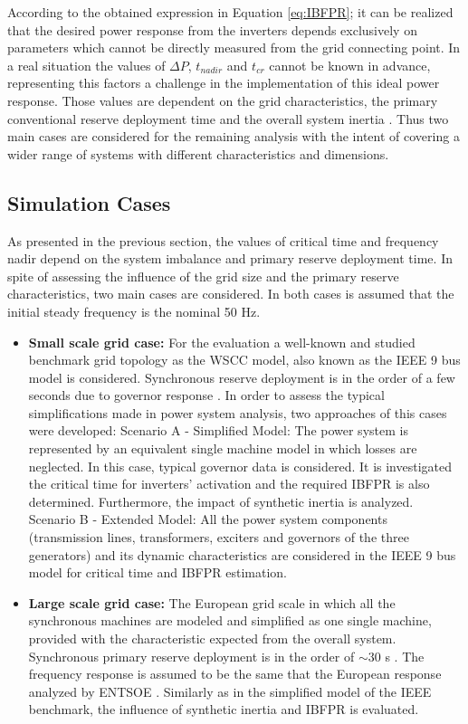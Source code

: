 According to the obtained expression in Equation \eqref{eq:IBFPR}; it can be realized that the desired power response from the inverters depends exclusively on parameters which cannot be directly measured from the grid connecting point. In a real situation the values of $\Delta P$, $ t_{nadir} $ and $ t_{cr} $ cannot be known in advance, representing this factors a challenge in the implementation of this ideal power response. Those values are dependent on the grid characteristics, the primary conventional reserve deployment time and the overall system inertia \cite{orum2015future}. Thus two main cases are considered for the remaining analysis with the intent of covering a wider range of systems with different characteristics and dimensions.

\subsection{Simulation Cases}

As presented in the previous section, the values of critical time and frequency nadir depend on the system imbalance and primary reserve deployment time. In spite of assessing the influence of the grid size and the primary reserve characteristics, two main cases are considered. In both cases is assumed that the initial steady frequency is the nominal 50 Hz.


\begin{itemize}[leftmargin=*,labelsep=5.8mm]
	\item \textbf{Small scale grid case:} For the evaluation a well-known and studied benchmark grid topology as the WSCC model, also known as the IEEE 9 bus model is considered. Synchronous reserve deployment is in the order of a few seconds due to governor response \cite{kundur1994power, sundaram2008comparing}. In order to assess the typical simplifications made in power system analysis, two approaches of this cases were developed:
	\subitem Scenario A - Simplified Model: The power system is represented by an equivalent single machine model in which losses are neglected. In this case, typical governor data is considered. It is investigated the critical time for inverters' activation and the required IBFPR is  also determined. Furthermore, the impact of synthetic inertia is analyzed.
	\subitem Scenario B - Extended Model: All the power system components (transmission lines, transformers, exciters and governors of the three generators) and its dynamic characteristics are considered in the IEEE 9 bus model for critical time and IBFPR estimation.\\
	\item \textbf{Large scale grid case:} The European grid scale in which all the synchronous machines are modeled and simplified as one single machine, provided with the characteristic expected from the overall system. Synchronous primary reserve deployment is in the order of $ \sim30 $ s \cite{ENTSOE.2016, hultholm2015optimal}. The frequency response is assumed to be the same that the European response analyzed by ENTSOE \cite{ENTSOE.2016}. Similarly as in the simplified model of the IEEE benchmark, the influence of synthetic inertia and IBFPR is evaluated.
\end{itemize}

